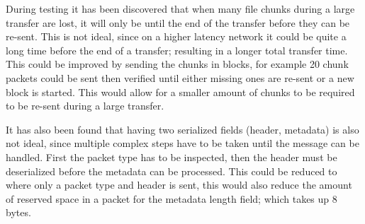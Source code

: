 During testing it has been discovered that when many file chunks during a large transfer are lost, it will only be until the end of the transfer before they can be re-sent. This is not ideal, since on a higher latency network it could be quite a long time before the end of a transfer; resulting in a longer total transfer time. This could be improved by sending the chunks in blocks, for example 20 chunk packets could be sent then verified until either missing ones are re-sent or a new block is started. This would allow for a smaller amount of chunks to be required to be re-sent during a large transfer.

It has also been found that having two serialized fields (header, metadata) is also not ideal, since multiple complex steps have to be taken until the message can be handled. First the packet type has to be inspected, then the header must be deserialized before the metadata can be processed. This could be reduced to where only a packet type and header is sent, this would also reduce the amount of reserved space in a packet for the metadata length field; which takes up 8 bytes.
